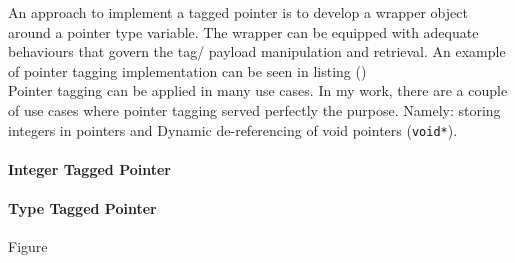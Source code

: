 An approach to implement a tagged pointer is to develop a wrapper object around a pointer type variable. The wrapper can be equipped with adequate behaviours that govern the tag/ payload manipulation and retrieval. An example of pointer tagging implementation can be seen in listing () \\
 
Pointer tagging can be applied in many use cases. In my work, there are a couple of use cases where pointer tagging served perfectly the purpose. Namely: storing integers in pointers and Dynamic de-referencing of void pointers (\texttt{void*}). 					

\paragraph{Integer Tagged Pointer}

\paragraph{Type Tagged Pointer} 
Figure

\clearpage